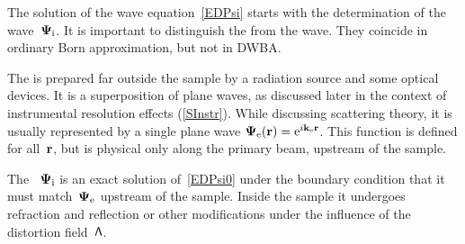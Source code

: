 The solution of the wave equation~\cref{EDPsi}
starts with the determination of the  wave~$\mathbf{\Psi}_{\text{i}}$.
%
%
%
%
%
%
%
It is important to distinguish the  from the  wave.
%
%
They coincide in ordinary Born approximation, but not in DWBA.

The 
is prepared far
outside the sample by a radiation source and some optical devices.
%
It is a superposition of plane waves,
as discussed later in the context of instrumental resolution effects
(\cref{SInstr}).
While discussing scattering theory,
it is usually represented by a single plane wave
$\mathbf{\Psi}_{\text{e}}(\mathbf{r})=\mathrm e^{i\mathbf{k}_{\text{e}}\mathbf{r}}$.
%
This function is defined for all~$\mathbf{r}$,
but is physical only along the primary beam, upstream of the sample.

The ~$\mathbf{\Psi}_{\text{i}}$
%
%
%
is an exact solution of~\cref{EDPsi0}
under the boundary condition that it must match~$\mathbf{\Psi}_{\text{e}}$
upstream of the sample.
Inside the sample it undergoes refraction and reflection
or other modifications under the influence of the distortion field~$\mathsf{\Lambda}$.

